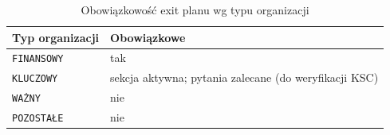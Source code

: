 \begin{table}[H]
\centering
\caption{Obowiązkowość exit planu wg typu organizacji}
\label{tab:exitplan-wagi}
\renewcommand{\arraystretch}{1.4}
\begin{tabular}{p{4.5cm}p{4.5cm}}
\toprule
\textbf{Typ organizacji} & \textbf{Obowiązkowe}\\
\midrule
\texttt{FINANSOWY} & tak\\
\midrule
\texttt{KLUCZOWY} & sekcja aktywna; pytania zalecane (do weryfikacji KSC)\\
\midrule
\texttt{WAŻNY} & nie\\
\midrule
\texttt{POZOSTAŁE} & nie \\
\bottomrule

\end{tabular}
\end{table}
























